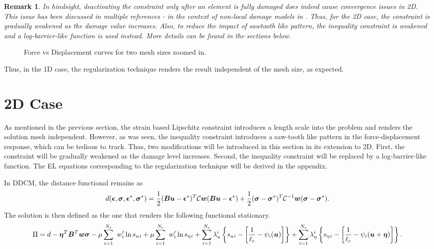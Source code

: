 \documentclass[11pt]{elsarticle}
\newtheorem*{remark}{Remark}
\begin{document}
\begin{remark}
	In hindsight, deactivating the constraint only after an element is fully damaged does indeed cause convergence issues in 2D. This issue has been discussed in multiple references - in the context of non-local damage models in \cite{Geers1998}. Thus, for the 2D case, the constraint is gradually weakened as the damage value increases. Also, to reduce the impact of sawtooth like pattern, the inequality constraint is weakened and a log-barrier-like function is used instead. More details can be found in the sections below.
\end{remark}


\begin{figure}[ht]
	\centering
	
	\caption{Force vs Displacement curves for two mesh sizes zoomed in.}
	\label{force_disp_nonlocal_zoom}
\end{figure}

Thus, in the 1D case, the regularization technique renders the result independent of the mesh size, as expected.

\section{2D Case}

As mentioned in the previous section, the strain based Lipschitz constraint introduces a length scale into the problem and renders the solution mesh independent. However, as was seen, the inequality constraint introduces a saw-tooth like pattern in the force-displacement response, which can be tedious to track. Thus, two modifications will be introduced in this section in its extension to 2D. First, the constraint will be gradually weakened as the damage level increases. Second, the inequality constraint will be replaced by a log-barrier-like function. The EL equations corresponding to the regularization technique will be derived in the appendix.

In DDCM, the distance functional remains as
\begin{equation}
	d(\mbox{\boldmath $\epsilon$},\mbox{\boldmath $\sigma$},\mbox{\boldmath $\epsilon$}^*,\mbox{\boldmath $\sigma$}^*) = \frac{1}{2}(\mbox{\boldmath $B$} \mbox{\boldmath $u$} - \mbox{\boldmath $\epsilon$}^*)^T\mathcal{C}\mbox{\boldmath $w$}(\mbox{\boldmath $B$} \mbox{\boldmath $u$} - \mbox{\boldmath $\epsilon$}^*) + \frac{1}{2}(\mbox{\boldmath $\sigma$} - \mbox{\boldmath $\sigma$}^*)^T\mathcal{C}^{-1}\mbox{\boldmath $w$}(\mbox{\boldmath $\sigma$} - \mbox{\boldmath $\sigma$}^*).
\end{equation}
The solution is then defined as the one that renders the following functional stationary.
\begin{equation}
	\Pi  = d -\mbox{\boldmath $\eta$} ^T \mbox{\boldmath $B$}^T \mbox{\boldmath $w$} \mbox{\boldmath $\sigma$} - \mu \sum_{i=1}^{N_c} \
	w_i' \ln s_u{_i} + \mu \sum_{i=1}^{N_c} \
	w_i' \ln s_\eta{_i} +\sum_{i=1}^{N_c} \lambda_u^ i \left\{ s_u{_i}  - \left[ \frac{1}{\ell_c}- \psi_i(\mbox{\boldmath $u$}) \right]  \right\} 
	+\sum_{i=1}^{N_c} \lambda_\eta^ i \left\{ s_\eta{_i}  - \left[ \frac{1}{\ell_c}- \psi_i(\mbox{\boldmath $u$}+\mbox{\boldmath $\eta$}) \right]  \right\}.
\end{equation}
\end{document}
